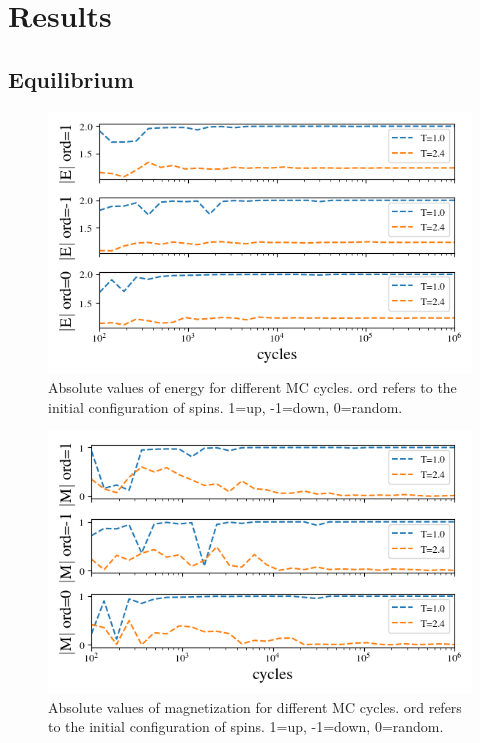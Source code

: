 \section{Results}



\subsection{Equilibrium}

\begin{figure}[H]
  \centering
  \includegraphics[width=\textwidth]{../figures/equilibrium_E.png}
  \caption{Absolute values of energy for different MC cycles.
  ord refers to the initial configuration of spins. 1=up, -1=down, 0=random.}
  \label{fig:equi_E}
\end{figure}


\begin{figure}[H]
  \centering
  \includegraphics[width=\textwidth]{../figures/equilibrium_M.png}
  \caption{Absolute values of magnetization for different MC cycles.
  ord refers to the initial configuration of spins. 1=up, -1=down, 0=random.}
  \label{fig:equi_M}
\end{figure}


